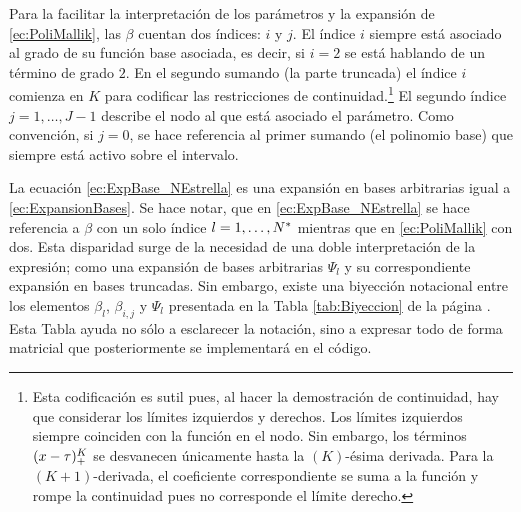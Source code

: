 \documentclass[../Main/Main.tex]{subfiles}
\begin{document}
Para la facilitar la interpretación de los parámetros y la expansión de \eqref{ec:PoliMallik}, las $\beta$ cuentan dos índices: $i$ y $j$. 
El índice $i$ siempre está asociado al grado de su función base asociada, es decir, si $i = 2$ se está hablando de un término de grado $2$. En el segundo sumando (la parte truncada) el índice $i$ comienza en $K$ para codificar las restricciones de continuidad.\footnote{Esta codificación es sutil pues, al hacer la demostración de continuidad, hay que considerar los límites izquierdos y derechos. Los límites izquierdos siempre coinciden con la función en el nodo. Sin embargo, los términos $(x-\tau)^K_+$ se desvanecen únicamente hasta la $(K)$-ésima derivada. Para la $(K+1)$-derivada, el coeficiente correspondiente se suma a la función y rompe la continuidad pues no corresponde el límite derecho.} El segundo índice $j = 1,\ldots, J-1$ describe el nodo al que está asociado el parámetro. Como convención, si $j = 0$, se hace referencia al primer sumando (el polinomio base) que siempre está activo sobre el intervalo. 

La ecuación \eqref{ec:ExpBase_NEstrella} es una expansión en bases arbitrarias igual a \eqref{ec:ExpansionBases}. Se hace notar, que en \eqref{ec:ExpBase_NEstrella} se hace referencia a $\beta$ con un solo índice $l = 1,\ldots,N^*$ mientras que en \eqref{ec:PoliMallik} con dos. Esta disparidad surge de la necesidad de una doble interpretación de la expresión; como una expansión de bases arbitrarias $\Psi_l$ y su correspondiente expansión en bases truncadas. Sin embargo, existe una biyección notacional entre los elementos $\beta_l$, $\beta_{i,j}$ y $\Psi_l$ presentada en la Tabla \ref{tab:Biyeccion} de la página \pageref{tab:Biyeccion}. Esta Tabla ayuda no sólo a esclarecer la notación, sino a expresar todo de forma matricial que posteriormente se implementará en el código. 
\end{document}
